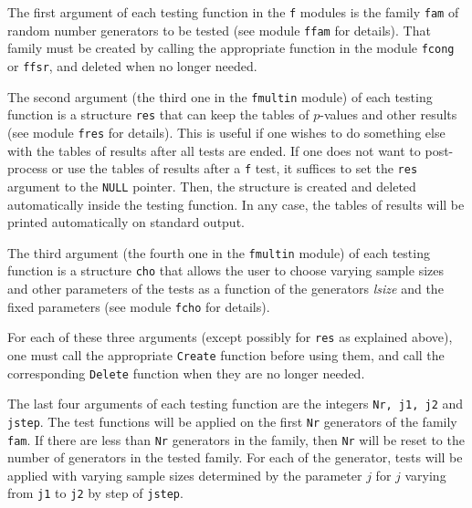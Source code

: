 The first argument of each testing function in the {\tt f} modules 
is the family {\tt fam} of random number generators to be tested
(see module {\tt ffam} for details).
That family must be created by calling the  appropriate function in
the module {\tt fcong} or {\tt ffsr}, and deleted when no longer needed.

The second argument (the third one in the {\tt fmultin} module)
of each testing function is a structure {\tt res} that can keep the tables
 of $p$-values and other results (see module {\tt fres} for details).
This is useful if one wishes to do something else with the tables of
results after all tests are ended. If one does not
want to post-process or use the tables of results after a {\tt f} test,
it suffices to set the {\tt res} argument to the {\tt NULL} pointer.
Then, the structure is created and deleted automatically inside the 
testing function. In any case, the tables of results will be printed
automatically on standard output.

The third argument (the fourth one in the {\tt fmultin} module)
of each testing function is a structure 
{\tt cho} that allows the user to choose varying sample sizes and
other parameters of the tests as a function of the generators {\it lsize}
and the fixed parameters (see module {\tt fcho} for details).

For each of these three arguments (except possibly for {\tt res} as
explained above), one must call the appropriate {\tt Create} function
before using them, and call the corresponding {\tt Delete} function
when they are no longer needed.

The last four arguments of each testing function are the integers 
{\tt Nr, j1, j2} and {\tt jstep}. The test functions will be applied on
the first {\tt Nr} generators of the family {\tt fam}.
If there are less than {\tt Nr} generators in the family, then {\tt Nr}
 will be reset to the number of generators in the tested family.
 For each of the generator, tests will be
applied with varying sample sizes determined by the parameter $j$ for
$j$ varying from {\tt j1} to {\tt j2} by step of {\tt jstep}.



